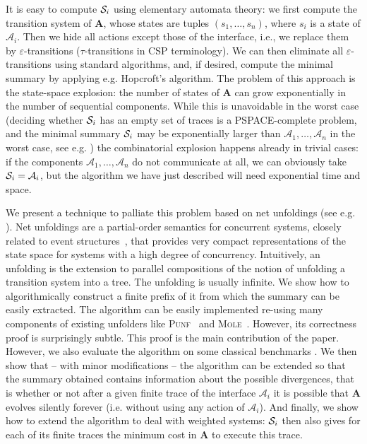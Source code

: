 \documentclass{llncs}
\def\A{\mathcal{A}}
\def\prod{\mathbf{A}}
\def\S{\mathcal{S}}
\renewcommand{\S}{{\cal S}}
\begin{document}
It is easy to compute $\S_i$ using elementary automata theory:
we first compute the transition system of $\prod$, whose states  
are tuples $(s_1, \ldots, s_n)$, where $s_i$ is a state of $\A_i$. Then we
hide all actions except those of the interface, i.e., we 
replace them by $\varepsilon$-transitions ($\tau$-transitions in CSP terminology). 
We can then eliminate all $\varepsilon$-transitions using standard algorithms, and, if
desired, compute the minimal summary by applying e.g. Hopcroft's algorithm.
The problem of this approach is the state-space explosion: the number of states of 
$\prod$ can grow exponentially in the number of sequential components. While this
is unavoidable in the worst case (deciding whether $\S_i$ has an empty set of traces 
is a PSPACE-complete problem, and the minimal summary $\S_i$ may be exponentially larger than 
$\A_1, \ldots, \A_n$ in the worst case, see e.g. \cite{HarelKV97}) the combinatorial explosion happens 
already in trivial cases: if the components $\A_1, \ldots, \A_n$ do not communicate at all, 
we can obviously take $\S_i=\A_i$, but the algorithm we have just 
described will need 
exponential time and space.

We present a technique to palliate this problem based on 
net unfoldings (see e.g. \cite{Esparza08}). Net unfoldings are a partial-order semantics for 
concurrent systems, closely related to event structures~\cite{Winskel11}, that provides very 
compact representations of the state space for systems with a high degree of concurrency. 
Intuitively, an unfolding is the extension to parallel compositions
of the notion of unfolding a transition system into a tree. The unfolding
is usually infinite. We show how to algorithmically construct a finite 
prefix of it from which the summary can be easily extracted. The algorithm 
can be easily implemented re-using many 
components of existing unfolders like \textsc{Punf}~\cite{Punf}
and \textsc{Mole}~\cite{Mole}.
However, its correctness proof is surprisingly subtle. This proof is 
the main contribution of the paper. 
However, we also evaluate the algorithm on some classical benchmarks \cite{Cor96}.
We then show that -- with minor modifications -- the algorithm can be extended so that the summary obtained contains information about the possible divergences, that is whether or not after a given finite trace of the interface $\A_i$ it is possible that $\prod$ evolves silently forever (i.e. without using any action of $\A_i$).
And finally, we show how to extend the algorithm to deal with weighted systems: $\S_i$ then also gives for each of its finite traces the minimum cost in $\prod$ to execute this trace.
\end{document}
